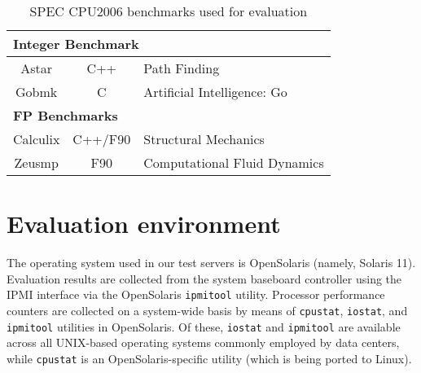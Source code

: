 \begin{table}[t]
  \centering
  \caption{SPEC CPU2006 benchmarks used for evaluation}
  \label{tab:addspec}
  \begin{tabular}{c c p{5cm}}
    \hline
    \multicolumn{3}{l}{\textbf{Integer Benchmark}} \\
    \hline
    Astar&C++&Path Finding\\
    Gobmk&C&Artificial Intelligence: Go\\
    \multicolumn{3}{l}{\textbf{FP Benchmarks}} \\
    \hline
    Calculix&C++/F90&Structural Mechanics\\
    Zeusmp&F90&Computational Fluid Dynamics\\
    \hline
  \end{tabular}
\end{table}

\section{Evaluation environment}
\label{sec:measurementtools}
The operating system used in our test servers is OpenSolaris (namely,
Solaris 11).  Evaluation results are collected from the system baseboard
controller using the IPMI interface via the OpenSolaris
\texttt{ipmitool} utility.  Processor performance counters are collected
on a system-wide basis by means of \texttt{cpustat}, \texttt{iostat},
and \texttt{ipmitool} utilities in OpenSolaris.  Of these,
\texttt{iostat} and \texttt{ipmitool} are available across all
UNIX-based operating systems commonly employed by data centers, while
\texttt{cpustat} is an OpenSolaris-specific utility (which is being
ported to Linux).

